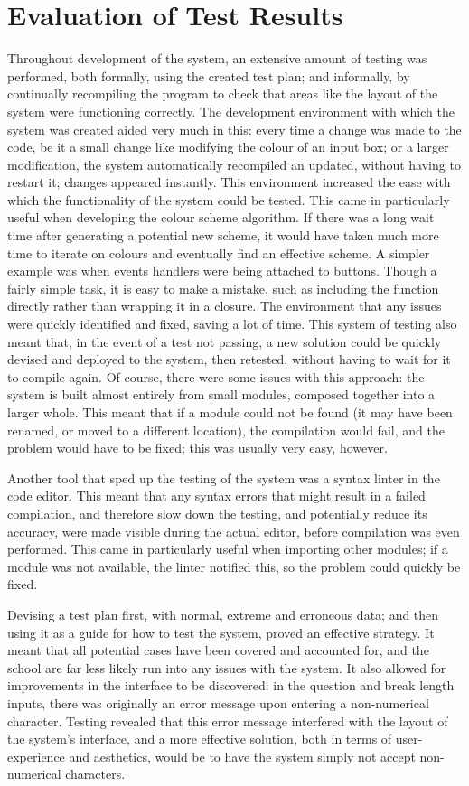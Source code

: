 \section{Evaluation of Test Results} %
\label{sec:evaluation_of_test_results}
Throughout development of the system, an extensive amount of testing was performed, both formally, using the created test plan; and informally, by continually recompiling the program to check that areas like the layout of the system were functioning correctly. The development environment with which the system was created aided very much in this: every time a change was made to the code, be it a small change like modifying the colour of an input box; or a larger modification, the system automatically recompiled an updated, without having to restart it; changes appeared instantly. This environment increased the ease with which the functionality of the system could be tested. This came in particularly useful when developing the colour scheme algorithm. If there was a long wait time after generating a potential new scheme, it would have taken much more time to iterate on colours and eventually find an effective scheme. A simpler example was when events handlers were being attached to buttons. Though a fairly simple task, it is easy to make a mistake, such as including the function directly rather than wrapping it in a closure. The environment that any issues were quickly identified and fixed, saving a lot of time. This system of testing also meant that, in the event of a test not passing, a new solution could be quickly devised and deployed to the system, then retested, without having to wait for it to compile again. Of course, there were some issues with this approach: the system is built almost entirely from small modules, composed together into a larger whole. This meant that if a module could not be found (it may have been renamed, or moved to a different location), the compilation would fail, and the problem would have to be fixed; this was usually very easy, however.

Another tool that sped up the testing of the system was a syntax linter in the code editor. This meant that any syntax errors that might result in a failed compilation, and therefore slow down the testing, and potentially reduce its accuracy, were made visible during the actual editor, before compilation was even performed. This came in particularly useful when importing other modules; if a module was not available, the linter notified this, so the problem could quickly be fixed.

Devising a test plan first, with normal, extreme and erroneous data; and then using it as a guide for how to test the system, proved an effective strategy. It meant that all potential cases have been covered and accounted for, and the school are far less likely run into any issues with the system. It also allowed for improvements in the interface to be discovered: in the question and break length inputs, there was originally an error message upon entering a non-numerical character. Testing revealed that this error message interfered with the layout of the system's interface, and a more effective solution, both in terms of user-experience and aesthetics, would be to have the system simply not accept non-numerical characters.
